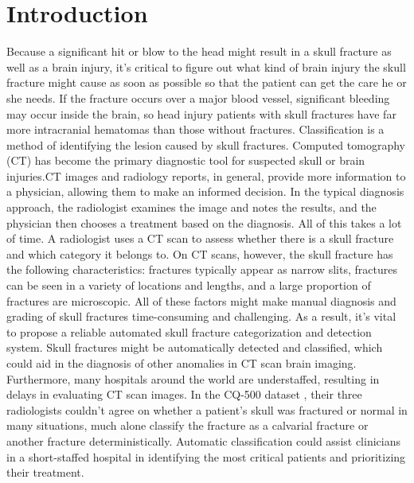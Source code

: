 \documentclass[sigconf]{acmart}
\begin{document}
\maketitle

\section{Introduction}
Because a significant hit or blow to the head might result in a skull fracture as well as a brain injury, it's critical to figure out what kind of brain injury the skull fracture might cause as soon as possible so that the patient can get the care he or she needs. If the fracture occurs over a major blood vessel, significant bleeding may occur inside the brain, so head injury patients with skull fractures have far more intracranial hematomas than those without fractures.\cite{zaki2008automated,liu2008hemorrhage} Classification is a method of identifying the lesion caused by skull fractures\cite{national2007head}. Computed tomography (CT) has become the primary diagnostic tool for suspected skull or brain injuries.CT images and radiology reports, in general, provide more information to a physician, allowing them to make an informed decision. In the typical diagnosis approach, the radiologist examines the image and notes the results, and the physician then chooses a treatment based on the diagnosis. All of this takes a lot of time. 
A radiologist uses a CT scan to assess whether there is a skull fracture and which category it belongs to. On CT scans, however, the skull fracture has the following characteristics: fractures typically appear as narrow slits, fractures can be seen in a variety of locations and lengths, and a large proportion of fractures are microscopic.
All of these factors might make manual diagnosis and grading of skull fractures time-consuming and challenging. As a result, it's vital to propose a reliable automated skull fracture categorization and detection system. Skull fractures might be automatically detected and classified, which could aid in the diagnosis of other anomalies in CT scan brain imaging. Furthermore, many hospitals around the world are understaffed, resulting in delays in evaluating CT scan images.
In the CQ-500 dataset \cite{CQ-500}, their three radiologists couldn't agree on whether a patient's skull was fractured or normal in many situations, much alone classify the fracture as a calvarial fracture or another fracture deterministically. Automatic classification could assist clinicians in a short-staffed hospital in identifying the most critical patients and prioritizing their treatment.
\end{document}
